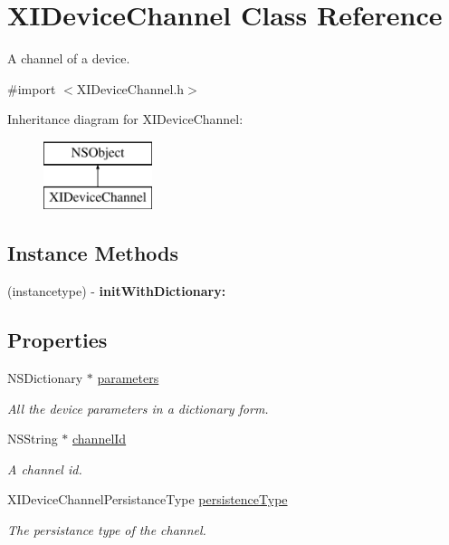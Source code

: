 \hypertarget{class_x_i_device_channel}{}\section{X\+I\+Device\+Channel Class Reference}
\label{class_x_i_device_channel}


A channel of a device.  




{\ttfamily \#import $<$X\+I\+Device\+Channel.\+h$>$}

Inheritance diagram for X\+I\+Device\+Channel\+:\begin{figure}[H]
\begin{center}
\leavevmode
\includegraphics[height=2.000000cm]{class_x_i_device_channel}
\end{center}
\end{figure}
\subsection*{Instance Methods}
\begin{DoxyCompactItemize}
\item 
\hypertarget{class_x_i_device_channel_a40b301fddc358aaf13f51ed9266c77af}{}\label{class_x_i_device_channel_a40b301fddc358aaf13f51ed9266c77af} 
(instancetype) -\/ {\bfseries init\+With\+Dictionary\+:}
\end{DoxyCompactItemize}
\subsection*{Properties}
\begin{DoxyCompactItemize}
\item 
N\+S\+Dictionary $\ast$ \hyperlink{class_x_i_device_channel_a6220031fb31ab40ebbf0544132cf0846}{parameters}
\begin{DoxyCompactList}\small\item\em All the device parameters in a dictionary form. \end{DoxyCompactList}\item 
N\+S\+String $\ast$ \hyperlink{class_x_i_device_channel_aa08449e44e03ac54b1acff4f37ff0de1}{channel\+Id}
\begin{DoxyCompactList}\small\item\em A channel id. \end{DoxyCompactList}\item 
X\+I\+Device\+Channel\+Persistance\+Type \hyperlink{class_x_i_device_channel_a50b7bcaf00bdd4185d1a5cc39332c3f2}{persistence\+Type}
\begin{DoxyCompactList}\small\item\em The persistance type of the channel. \end{DoxyCompactList}\end{DoxyCompactItemize}


